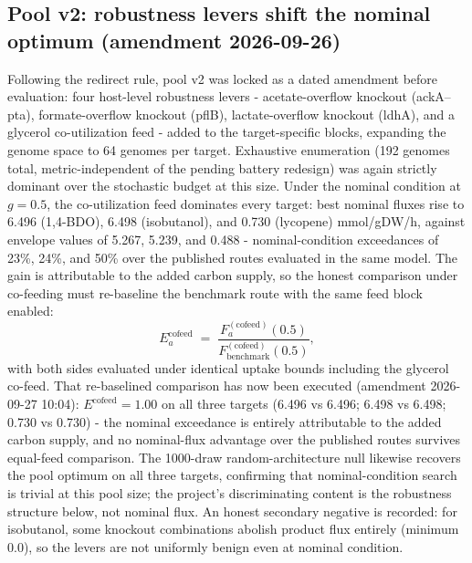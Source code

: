 \documentclass[12pt,a4paper]{article}
\begin{document}
\subsection{Pool v2: robustness levers shift the nominal optimum (amendment 2026-09-26)}
Following the redirect rule, pool v2 was locked as a dated amendment before evaluation: four host-level robustness levers - acetate-overflow knockout (ackA--pta), formate-overflow knockout (pflB), lactate-overflow knockout (ldhA), and a glycerol co-utilization feed - added to the target-specific blocks, expanding the genome space to 64 genomes per target. Exhaustive enumeration (192 genomes total, metric-independent of the pending battery redesign) was again strictly dominant over the stochastic budget at this size. Under the nominal condition at $g=0.5$, the co-utilization feed dominates every target: best nominal fluxes rise to 6.496 (1,4-BDO), 6.498 (isobutanol), and 0.730 (lycopene) mmol/gDW/h, against envelope values of 5.267, 5.239, and 0.488 - nominal-condition exceedances of 23\%, 24\%, and 50\% over the published routes evaluated in the same model. The gain is attributable to the added carbon supply, so the honest comparison under co-feeding must re-baseline the benchmark route with the same feed block enabled:
\begin{equation}
E_a^{\mathrm{cofeed}} \;=\; \frac{F_a^{(\mathrm{cofeed})}(0.5)}{F_{\mathrm{benchmark}}^{(\mathrm{cofeed})}(0.5)},
\end{equation}
with both sides evaluated under identical uptake bounds including the glycerol co-feed. That re-baselined comparison has now been executed (amendment 2026-09-27 10:04): $E^{\mathrm{cofeed}} = 1.00$ on all three targets (6.496 vs 6.496; 6.498 vs 6.498; 0.730 vs 0.730) - the nominal exceedance is entirely attributable to the added carbon supply, and no nominal-flux advantage over the published routes survives equal-feed comparison. The 1000-draw random-architecture null likewise recovers the pool optimum on all three targets, confirming that nominal-condition search is trivial at this pool size; the project's discriminating content is the robustness structure below, not nominal flux. An honest secondary negative is recorded: for isobutanol, some knockout combinations abolish product flux entirely (minimum 0.0), so the levers are not uniformly benign even at nominal condition.
\end{document}
